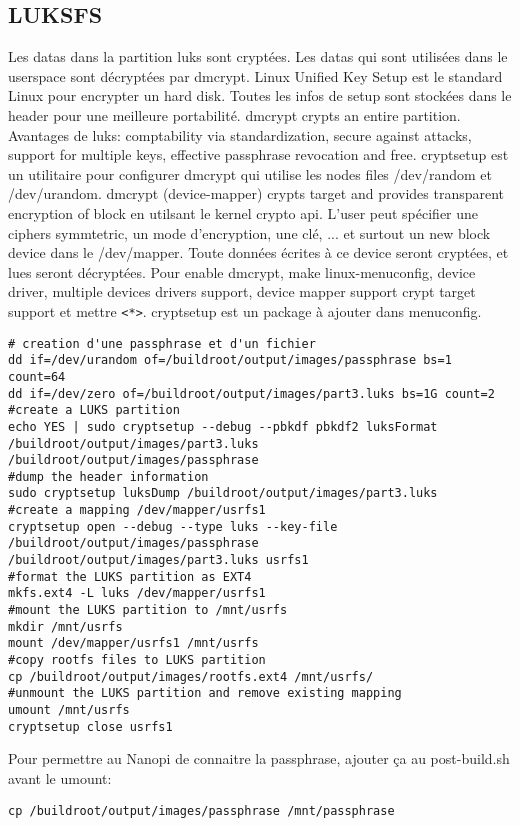 \subsection{LUKSFS}
Les datas dans la partition luks sont cryptées. Les datas qui sont utilisées dans le userspace sont décryptées par dmcrypt. Linux Unified Key Setup est le standard Linux pour encrypter un hard disk. Toutes les infos de setup sont stockées dans le header pour une meilleure portabilité. dmcrypt crypts an entire partition. Avantages de luks: comptability via standardization, secure against attacks, support for multiple keys, effective passphrase revocation and free. cryptsetup est un utilitaire pour configurer dmcrypt qui utilise les nodes files /dev/random et /dev/urandom. dmcrypt (device-mapper) crypts target and provides transparent encryption of block en utilsant le kernel crypto api. L'user peut spécifier une ciphers symmtetric, un mode d'encryption, une clé, ... et surtout un new block device dans le /dev/mapper. Toute données écrites à ce device seront cryptées, et lues seront décryptées. Pour enable dmcrypt, make linux-menuconfig, device driver, multiple devices drivers support, device mapper support crypt target support et mettre \verb!<*>!. cryptsetup est un package à ajouter dans menuconfig.
\begin{lstlisting}[style=bash]
# creation d'une passphrase et d'un fichier
dd if=/dev/urandom of=/buildroot/output/images/passphrase bs=1 count=64
dd if=/dev/zero of=/buildroot/output/images/part3.luks bs=1G count=2
#create a LUKS partition
echo YES | sudo cryptsetup --debug --pbkdf pbkdf2 luksFormat
/buildroot/output/images/part3.luks /buildroot/output/images/passphrase
#dump the header information
sudo cryptsetup luksDump /buildroot/output/images/part3.luks
#create a mapping /dev/mapper/usrfs1
cryptsetup open --debug --type luks --key-file
/buildroot/output/images/passphrase /buildroot/output/images/part3.luks usrfs1
#format the LUKS partition as EXT4
mkfs.ext4 -L luks /dev/mapper/usrfs1
#mount the LUKS partition to /mnt/usrfs
mkdir /mnt/usrfs
mount /dev/mapper/usrfs1 /mnt/usrfs
#copy rootfs files to LUKS partition
cp /buildroot/output/images/rootfs.ext4 /mnt/usrfs/
#unmount the LUKS partition and remove existing mapping
umount /mnt/usrfs
cryptsetup close usrfs1
\end{lstlisting}
Pour permettre au Nanopi de connaitre la passphrase, ajouter ça au post-build.sh avant le umount: 
\begin{lstlisting}[style=bash]
cp /buildroot/output/images/passphrase /mnt/passphrase
\end{lstlisting}
